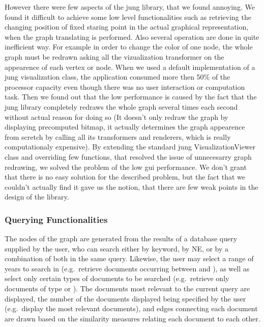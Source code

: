 However there were few aspects of the jung library, that we found annoying. We found it difficult to achieve some low level functionalities such as retrieving the changing position of fixed staring point in the actual graphical representation, when the graph translating is performed. Also several operation are done in quite inefficient way. For example in order to change the color of one node, the whole graph must be redrawn asking all the vizualization transformer on the appearence of each vertex or node. When we used a default implementation of a jung visualization class, the application consumed more then 50\% of the processor capacity even though there was no user interaction or computation task. Then we found out that the low performance is caused by the fact that the jung library completely redraws the whole graph several times each second without actual reason for doing so (It doesn't only redraw the graph by displaying precomputed bitmap, it actually determines the graph appearence from scretch by calling all its transformers and renderers, which is really computationaly expensive). By extending the standard jung VisualizationViewer class and overriding few functions, that resolved the issue of unnecesarry graph redrawing, we solved the problem of the low gui performance. We don't grant that there is no easy solution for the described problem, but the fact that we couldn't actually find it gave us the notion, that there are few weak points in the design of the library.

\subsubsection {Querying Functionalities}
\label{sec:querying_functionalities}
The nodes of the graph are generated from the results of a database query supplied by the user, who can search either by keyword, by NE, or by a combination of both in the same query. Likewise, the user may select a range of years to search in (e.g.\ retrieve documents occurring between  and ), as well as select only certain types of documents to be searched (e.g.\ retrieve only documents of type  or ). The documents most relevant to the current query are displayed, the number of the documents displayed being specified by the user (e.g.\ display the  most relevant documents), and edges connecting each document are drawn based on the similarity measures relating each document to each other.

